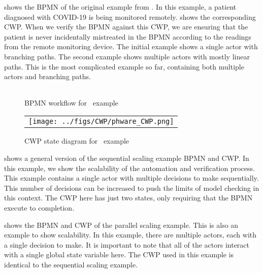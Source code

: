  shows the BPMN of the original example from \cite{mercer22}. In this example, a patient diagnosed with COVID-19 is being monitored remotely.  shows the corresponding CWP. When we verify the BPMN against this CWP, we are ensuring that the patient is never incidentally mistreated in the BPMN according to the readings from the remote monitoring device. The initial example shows a single actor with branching paths. The second example shows multiple actors with mostly linear paths. This is the most complicated example so far, containing both multiple actors and branching paths.

\begin{figure*}[t]
  \begin{center}
    \begin{tabular}{c}
        
    \end{tabular}
  \end{center}
\caption{BPMN workflow for \phware~example}
\label{fig:phware_bpmn}
\end{figure*}

\begin{figure*}[t]
  \begin{center}
    \begin{tabular}{c}
        \texttt{[image: ../figs/CWP/phware\_CWP.png]}
    \end{tabular}
  \end{center}
\caption{CWP state diagram for \phware~example}
\label{fig:phware_cwp}
\end{figure*}

 shows a general version of the sequential scaling example BPMN and CWP. In this example, we show the scalability of the automation and verification process. This example contains a single actor with multiple decisions to make sequentially.
This number of decisions can be increased to push the limits of model checking in this context. The CWP here has just two states, only requiring that the BPMN execute to completion.


 shows the BPMN and CWP of the parallel scaling example. This is also an example to show scalability. In this example, there are multiple actors, each with a single decision to make. It is important to note that all of the actors interact with a single global state variable here. The CWP used in this example is identical to the sequential scaling example.

